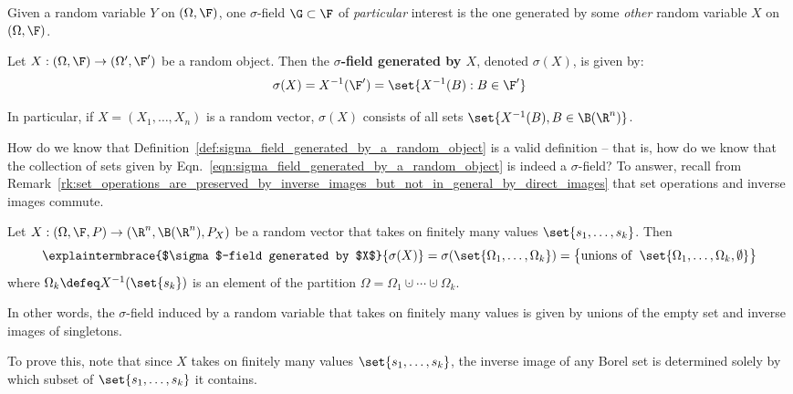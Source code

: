 \documentclass{article} %
\begin{document}
Given a random variable $Y$ on $(\Omega, \F)$, one $\sigma$-field $\G \subset \F$ of \textit{particular} interest is the one generated by some \textit{other} random variable $X$ on $(\Omega, \F)$.

\begin{definition}
Let $X: (\Omega, \F) \to (\Omega', \F')$ be a random object.  Then the \textbf{$\sigma$-field generated by $X$}, denoted $\sigma(X)$, is given by:
\begin{align}
\sigma(X) = X^{-1}(\F') = \set{X^{-1}(B) : B \in \F'} 
\label{eqn:sigma_field_generated_by_a_random_object}
\end{align}

\label{def:sigma_field_generated_by_a_random_object}
\end{definition}

\begin{remark}
In particular, if $X = (X_1,\hdots,X_n)$ is a random vector, $\sigma(X)$ consists of all sets $\set{X^{-1}(B), B \in \B(\R^n)}$. %
\label{rk:sigma_field_generated_by_a_random_vector}	
\end{remark}

\begin{remark}
How do we know that Definition~\ref{def:sigma_field_generated_by_a_random_object} is a valid definition --  that is, how do we know that the collection of sets given by Eqn.~\ref{eqn:sigma_field_generated_by_a_random_object} is indeed a $\sigma$-field?  To answer, recall from Remark~\ref{rk:set_operations_are_preserved_by_inverse_images_but_not_in_general_by_direct_images}	 that set operations and inverse images commute.  
\end{remark}

\begin{example}
Let $X : (\Omega, \F, P) \to (\R^n, \B(\R^n), P_X)$ be a random vector that takes on finitely many values $\set{s_1, \hdots, s_k}$.  Then 
\[  \explaintermbrace{$\sigma$-field generated by $X$}{\sigma(X)} = \sigma(\set{\Omega_1, \hdots, \Omega_k}) = \big\{\text{unions of } \;  \set{\Omega_1, \hdots, \Omega_k, \emptyset} \big\}\]
where $\Omega_k \defeq X^{-1}(\set{s_k})$ is an element of the partition $\Omega = \Omega_1 \cupdot \cdots \cupdot \Omega_k$.

In other words, the $\sigma$-field induced by a random variable that takes on finitely many values is given by unions of the empty set and inverse images of singletons.

To prove this, note that since $X$ takes on finitely many values $\set{s_1,\hdots, s_k}$, the inverse image of any Borel set is determined solely by which subset of  $\set{s_1,\hdots, s_k}$ it contains.
\label{ex:sigma_field_induced_by_random_vector_that_takes_on_finitely_many_values}	
\end{example}
\end{document}
